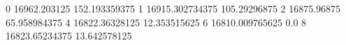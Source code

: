 0 16962.203125 152.193359375
1 16915.302734375 105.29296875
2 16875.96875 65.958984375
4 16822.36328125 12.353515625
6 16810.009765625 0.0
8 16823.65234375 13.642578125
